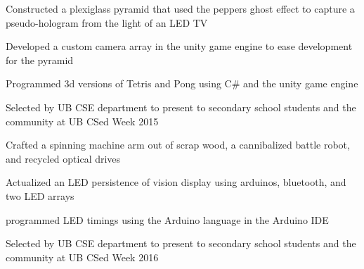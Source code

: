 \documentclass[]{deedy-resume-openfont}
\begin{document}
\begin{minipage}[t]{0.66\textwidth}
\begin{tightemize}
\item Constructed a plexiglass pyramid that used the peppers ghost effect to capture a pseudo-hologram from the light of an LED TV
\item Developed a custom camera array in the unity game engine to ease development for the pyramid
\item Programmed 3d versions of Tetris and Pong using C\# and the unity game engine
\item Selected by UB CSE department to present to secondary school students and the community at UB CSed Week 2015
\end{tightemize}
\sectionsep

\begin{tightemize}
\item Crafted a spinning machine arm out of scrap wood, a cannibalized battle robot, and recycled optical drives
\item Actualized an LED persistence of vision display using arduinos, bluetooth, and two LED arrays
\item programmed LED timings using the Arduino language in the Arduino IDE
\item Selected by UB CSE department to present to secondary school students and the community at UB CSed Week 2016
\end{tightemize}
\sectionsep








\end{minipage}
\end{document}
